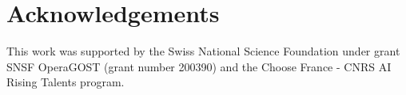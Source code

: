 \section*{Acknowledgements}
 This work was supported by the Swiss National Science Foundation under grant SNSF OperaGOST (grant number 200390) and the Choose France - CNRS AI Rising Talents program.